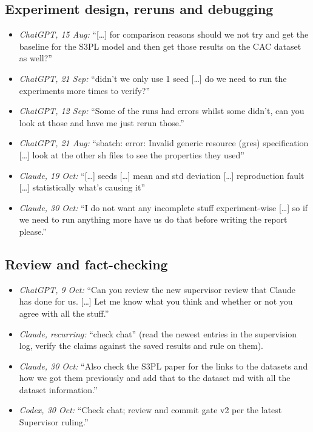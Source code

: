 \subsection*{Experiment design, reruns and debugging}
\begin{itemize}
  \item \emph{ChatGPT, 15 Aug:} ``[\ldots] for comparison reasons should we not
        try and get the baseline for the S3PL model and then get those results
        on the CAC dataset as well?''
  \item \emph{ChatGPT, 21 Sep:} ``didn't we only use 1 seed [\ldots] do we need
        to run the experiments more times to verify?''
  \item \emph{ChatGPT, 12 Sep:} ``Some of the runs had errors whilst some didn't,
        can you look at those and have me just rerun those.''
  \item \emph{ChatGPT, 21 Aug:} ``sbatch: error: Invalid generic resource (gres)
        specification [\ldots] look at the other sh files to see the properties
        they used''
  \item \emph{Claude, 19 Oct:} ``[\ldots] seeds [\ldots] mean and std deviation
        [\ldots] reproduction fault [\ldots] statistically what's causing it''
  \item \emph{Claude, 30 Oct:} ``I do not want any incomplete stuff
        experiment-wise [\ldots] so if we need to run anything more have us do
        that before writing the report please.''
\end{itemize}

\subsection*{Review and fact-checking}
\begin{itemize}
  \item \emph{ChatGPT, 9 Oct:} ``Can you review the new supervisor review that
        Claude has done for us. [\ldots] Let me know what you think and whether
        or not you agree with all the stuff.''
  \item \emph{Claude, recurring:} ``check chat'' (read the newest entries in the
        supervision log, verify the claims against the saved results and rule
        on them).
  \item \emph{Claude, 30 Oct:} ``Also check the S3PL paper for the links to the
        datasets and how we got them previously and add that to the dataset md
        with all the dataset information.''
  \item \emph{Codex, 30 Oct:} ``Check chat; review and commit gate v2 per the
        latest Supervisor ruling.''
\end{itemize}

